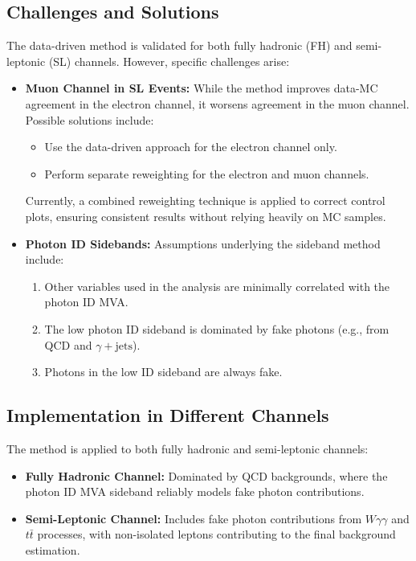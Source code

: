 \subsection{Challenges and Solutions}
The data-driven method is validated for both fully hadronic (FH) and semi-leptonic (SL) channels. However, specific challenges arise:
\begin{itemize}
    \item \textbf{Muon Channel in SL Events:}
    While the method improves data-MC agreement in the electron channel, it worsens agreement in the muon channel. Possible solutions include:
    \begin{itemize}
        \item Use the data-driven approach for the electron channel only.
        \item Perform separate reweighting for the electron and muon channels.
    \end{itemize}
    Currently, a combined reweighting technique is applied to correct control plots, ensuring consistent results without relying
    heavily on MC samples.

    \item \textbf{Photon ID Sidebands:}
    Assumptions underlying the sideband method include:
    \begin{enumerate}
        \item Other variables used in the analysis are minimally correlated with the photon ID MVA.
        \item The low photon ID sideband is dominated by fake photons (e.g., from QCD and \(\gamma + \text{jets}\)).
        \item Photons in the low ID sideband are always fake.
    \end{enumerate}
\end{itemize}

\subsection{Implementation in Different Channels}
The method is applied to both fully hadronic and semi-leptonic channels:
\begin{itemize}
    \item \textbf{Fully Hadronic Channel:}
    Dominated by QCD backgrounds, where the photon ID MVA sideband reliably models fake photon contributions.
    \item \textbf{Semi-Leptonic Channel:}
    Includes fake photon contributions from \(W\gamma\gamma\) and \(t\bar{t}\) processes, with non-isolated leptons contributing to
    the final background estimation.
\end{itemize}

